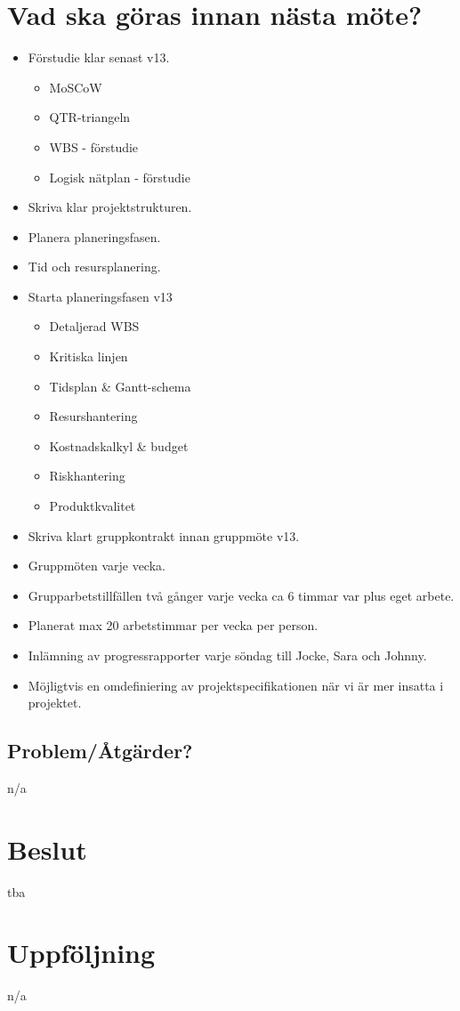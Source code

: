 \section*{Vad ska göras innan nästa möte?}
\begin{itemize}[noitemsep]
    \item Förstudie klar senast v13.
    \begin{itemize}[noitemsep]
        \item MoSCoW
        \item QTR-triangeln
        \item WBS - förstudie
        \item Logisk nätplan - förstudie
    \end{itemize}
    \item Skriva klar projektstrukturen.
    \item Planera planeringsfasen.
    \item Tid och resursplanering.
    \item Starta planeringsfasen v13
    \begin{itemize}[noitemsep]
        \item Detaljerad WBS
        \item Kritiska linjen
        \item Tidsplan \& Gantt-schema
        \item Resurshantering
        \item Kostnadskalkyl \& budget
        \item Riskhantering
        \item Produktkvalitet
    \end{itemize}
    \item Skriva klart gruppkontrakt innan gruppmöte v13.
    \item Gruppmöten varje vecka.
    \item Grupparbetstillfällen två gånger varje vecka ca 6 timmar var plus eget arbete.
    \item Planerat max 20 arbetstimmar per vecka per person.
    \item Inlämning av progressrapporter varje söndag till Jocke, Sara och Johnny.
    \item Möjligtvis en omdefiniering av projektspecifikationen när vi är mer insatta i projektet.
\end{itemize}

\subsection*{Problem/Åtgärder?}
n/a

\section*{Beslut}
tba

\section*{Uppföljning}
n/a
